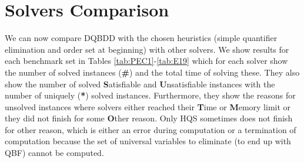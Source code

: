 \documentclass[
  digital, %
  color,
  twoside, %
  table,   %
  nolof,     %
  nolot,     %
]{fithesis3}
\theoremstyle{definition}
\theoremstyle{remark}
\begin{document}
\section{Solvers Comparison}
We can now compare DQBDD with the chosen heuristics (simple quantifier elimination and order set at beginning) with other solvers. We show results for each benchmark set in Tables \ref{tab:PEC1}-\ref{tab:E19} which for each solver show the number of solved instances (\textbf{\#}) and the total time of solving these. They also show the number of solved \textbf{S}atisfiable and \textbf{U}n\-sa\-ti\-sfi\-able instances with the number of uniquely (\textbf{*}) solved instances. Furthermore, they show the reasons for unsolved instances where solvers either reached their \textbf{T}ime or \textbf{M}emory limit or they did not finish for some \textbf{O}ther reason. Only HQS sometimes does not finish for other reason, which is either an error during computation or a termination of computation because the set of universal variables to eliminate (to end up with QBF) cannot be computed. 

%
\end{document}
